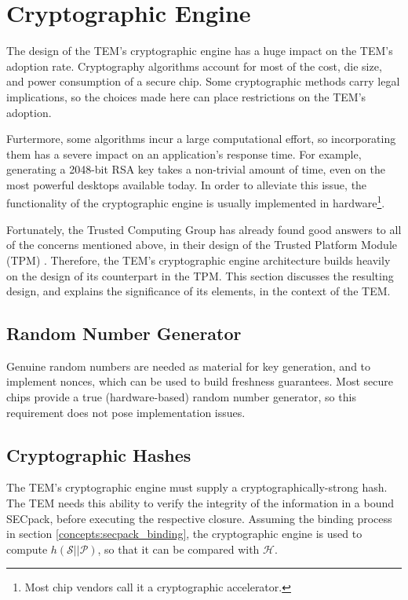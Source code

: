 \section{Cryptographic Engine}\label{arch:crypto}

The design of the TEM's cryptographic engine has a huge impact on the TEM's
adoption rate. Cryptography algorithms account for most of the cost, die
size, and power consumption of a secure chip. Some cryptographic methods
carry legal implications, so the choices made here can place restrictions on
the TEM's adoption.

Furtermore, some algorithms incur a large computational effort, so incorporating
them has a severe impact on an application's response time. For example,
generating a 2048-bit RSA key takes a non-trivial amount of time, even on the
most powerful desktops available today. In order to alleviate this issue, the
functionality of the cryptographic engine is usually implemented in
hardware\footnote{Most chip vendors call it a cryptographic accelerator.}.

Fortunately, the Trusted Computing Group has already found good answers to
all of the concerns mentioned above, in their design of the Trusted Platform
Module (TPM) \cite{tcpa2007}. Therefore, the TEM's cryptographic engine
architecture builds heavily on the design of its counterpart in the TPM. This
section discusses the resulting design, and explains the significance of its
elements, in the context of the TEM.

\subsection{Random Number Generator}\label{arch:crypto_rng}
Genuine random numbers are needed as material for key generation, and to
implement nonces, which can be used to build freshness guarantees. Most secure
chips provide a true (hardware-based) random number generator, so this
requirement does not pose implementation issues.

\subsection{Cryptographic Hashes}\label{arch:crypto_hash}
The TEM's cryptographic engine must supply a cryptographically-strong hash.
The TEM needs this ability to verify the integrity of the information in
a bound SECpack, before executing the respective closure. Assuming the binding
process in section \ref{concepts:secpack_binding}, the cryptographic engine is
used to compute $h(\mathcal S || \mathcal P)$, so that it can be
compared with $\mathcal H$.

